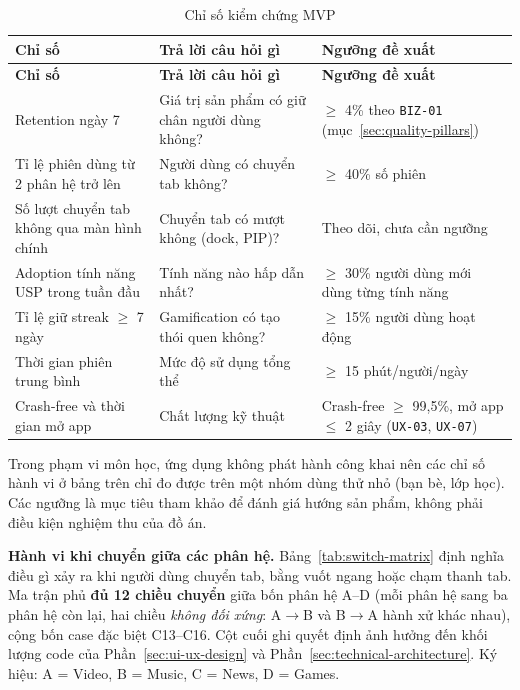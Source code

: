 \begin{longtable}{>{\raggedright\arraybackslash}p{4.2cm} >{\raggedright\arraybackslash}p{8cm} >{\raggedright\arraybackslash}p{3.2cm}}
\caption{Chỉ số kiểm chứng MVP}
\label{tab:mvp-metrics}\\
\toprule
\textbf{Chỉ số} & \textbf{Trả lời câu hỏi gì} & \textbf{Ngưỡng đề xuất} \\
\midrule
\endfirsthead
\toprule
\textbf{Chỉ số} & \textbf{Trả lời câu hỏi gì} & \textbf{Ngưỡng đề xuất} \\
\midrule
\endhead
\bottomrule
\endfoot
Retention ngày 7 & Giá trị sản phẩm có giữ chân người dùng không? & $\geq$ 4\% theo \texttt{BIZ-01} (mục~\ref{sec:quality-pillars}) \\
\midrule
Tỉ lệ phiên dùng từ 2 phân hệ trở lên & Người dùng có chuyển tab không? & $\geq$ 40\% số phiên \\
\midrule
Số lượt chuyển tab không qua màn hình chính & Chuyển tab có mượt không (dock, PIP)? & Theo dõi, chưa cần ngưỡng \\
\midrule
Adoption tính năng USP trong tuần đầu & Tính năng nào hấp dẫn nhất? & $\geq$ 30\% người dùng mới dùng từng tính năng \\
\midrule
Tỉ lệ giữ streak $\geq$ 7 ngày & Gamification có tạo thói quen không? & $\geq$ 15\% người dùng hoạt động \\
\midrule
Thời gian phiên trung bình & Mức độ sử dụng tổng thể & $\geq$ 15 phút/người/ngày \\
\midrule
Crash-free và thời gian mở app & Chất lượng kỹ thuật & Crash-free $\geq$ 99,5\%, mở app $\leq$ 2 giây (\texttt{UX-03}, \texttt{UX-07}) \\
\end{longtable}

Trong phạm vi môn học, ứng dụng không phát hành công khai nên các chỉ số hành vi ở bảng trên chỉ đo được trên một nhóm dùng thử nhỏ (bạn bè, lớp học). Các ngưỡng là mục tiêu tham khảo để đánh giá hướng sản phẩm, không phải điều kiện nghiệm thu của đồ án.

\textbf{Hành vi khi chuyển giữa các phân hệ.} Bảng~\ref{tab:switch-matrix} định nghĩa điều gì xảy ra khi người dùng chuyển tab, bằng vuốt ngang hoặc chạm thanh tab. Ma trận phủ \textbf{đủ 12 chiều chuyển} giữa bốn phân hệ A--D (mỗi phân hệ sang ba phân hệ còn lại, hai chiều \textit{không đối xứng}: A$\rightarrow$B và B$\rightarrow$A hành xử khác nhau), cộng bốn case đặc biệt C13--C16. Cột cuối ghi quyết định ảnh hưởng đến khối lượng code của Phần~\ref{sec:ui-ux-design} và Phần~\ref{sec:technical-architecture}. Ký hiệu: A = Video, B = Music, C = News, D = Games.

